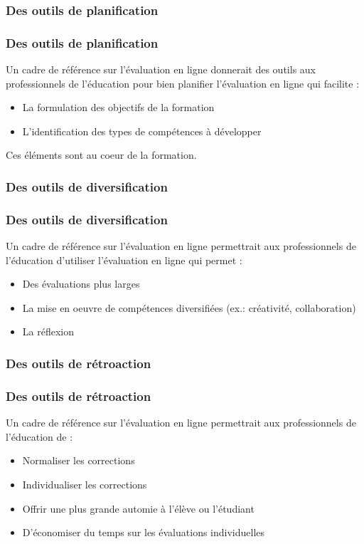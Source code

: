 \documentclass[aspectratio=169]{beamer}
\begin{document}
			\subsubsection{Des outils de planification \citep{Dubreucq2011}} 
				\begin{frame}
			 		\frametitle{Des outils de planification \citep{Dubreucq2011}}
					Un cadre de référence sur l'évaluation en ligne donnerait des outils aux professionnels de l'éducation pour bien planifier l'évaluation en ligne qui facilite :
					\begin {itemize}
						\item La formulation des objectifs de la formation
						\item L'identification des types de compétences à développer
					\end{itemize}
					Ces éléments sont au coeur de la formation.
				\end{frame}
			
			\subsubsection{Des outils de diversification\citep{Dubreucq2011}} 
				\begin{frame}
			 		\frametitle{Des outils de diversification\citep{Dubreucq2011}}
			 		Un cadre de référence sur l'évaluation en ligne permettrait aux professionnels de l'éducation d'utiliser l'évaluation en ligne qui permet : 
					\begin {itemize}
						\item Des évaluations plus larges
						\item La mise en oeuvre de compétences diversifiées (ex.: créativité, collaboration)
						\item La réflexion
					\end{itemize}
				\end{frame}
				
			\subsubsection{Des outils de rétroaction\citep{Dubreucq2011}} 
				\begin{frame}
			 		\frametitle{Des outils de rétroaction\citep{Dubreucq2011}}
					Un cadre de référence sur l'évaluation en ligne permettrait aux professionnels de l'éducation de : 
					\begin {itemize}
						\item Normaliser les corrections
						\item Individualiser les corrections
						\item Offrir une plus grande automie à l'élève ou l'étudiant
						\item D'économiser du temps sur les évaluations individuelles
					\end{itemize}
				\end{frame}
				
\end{document}
